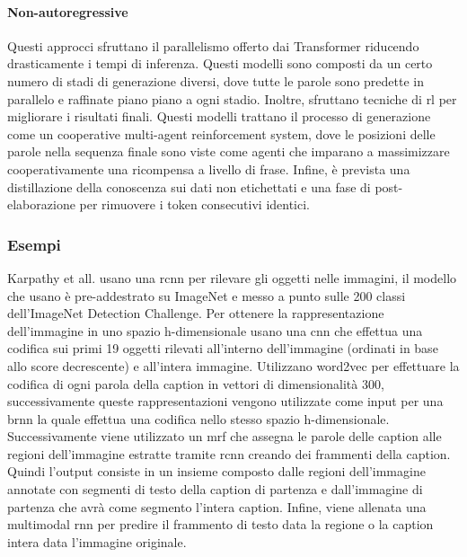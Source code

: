 \paragraph{Non-autoregressive}
Questi approcci sfruttano il parallelismo offerto dai Transformer riducendo drasticamente i tempi di inferenza. Questi modelli sono composti da un certo numero di stadi di generazione diversi, dove tutte le parole sono predette in parallelo e raffinate piano piano a ogni stadio. Inoltre, sfruttano tecniche di \acrlong{rl} per migliorare i risultati finali. Questi modelli trattano il processo di generazione come un cooperative multi-agent reinforcement system, dove le posizioni delle parole nella sequenza finale sono viste come agenti che imparano a massimizzare cooperativamente una ricompensa a livello di frase. Infine, è prevista una distillazione della conoscenza sui dati non etichettati e una fase di post-elaborazione per rimuovere i token consecutivi identici.

\subsubsection{Esempi}
Karpathy et all. \cite{karpathy2015deep} usano una \acrshort{rcnn} per rilevare gli oggetti nelle immagini, il modello che usano è pre-addestrato su ImageNet e messo a punto sulle 200 classi dell'ImageNet Detection Challenge. Per ottenere la rappresentazione dell'immagine in uno spazio h-dimensionale usano una \acrshort{cnn} che effettua una codifica sui primi 19 oggetti rilevati all'interno dell'immagine (ordinati in base allo score decrescente) e all'intera immagine. Utilizzano word2vec \cite{mikolov2013efficient} per effettuare la codifica di ogni parola della caption in vettori di dimensionalità 300, successivamente queste rappresentazioni vengono utilizzate come input per una \acrfull{brnn} la quale effettua una codifica nello stesso spazio h-dimensionale. Successivamente viene utilizzato un \acrfull{mrf} che assegna le parole delle caption alle regioni dell'immagine estratte tramite \acrshort{rcnn} creando dei frammenti della caption.
Quindi l'output consiste in un insieme composto dalle regioni dell'immagine annotate con segmenti di testo della caption di partenza e dall'immagine di partenza che avrà come segmento l'intera caption.
Infine, viene allenata una multimodal \acrshort{rnn} per predire il frammento di testo data la regione o la caption intera data l'immagine originale. %

